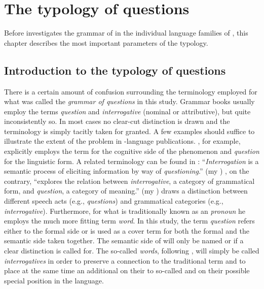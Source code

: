 \chapter{The typology of questions}

Before  investigates the grammar of  in the individual language families of , this chapter describes the most important parameters of the typology.


\section{Introduction to the typology of questions}\label{sec:4.1}

There is a certain amount of confusion surrounding the terminology employed for what was called the \textit{grammar of questions} in this study. Grammar books usually employ the terms \textit{question} and \textit{interrogative} (nominal or attributive), but quite inconsistently so. In most cases no clear-cut distinction is drawn and the terminology is simply tacitly taken for granted. A few examples should suffice to illustrate the extent of the problem in -language publications. \citet[250]{Schulze2007}, for example, explicitly employs the term \textit{} for the cognitive side of the phenomenon and \textit{question} for the linguistic form. A related terminology can be found in \citet[103]{Rajasingh2014}: “\textit{Interrogation} is a semantic process of eliciting information by way of \textit{questioning}.” (my ) \citet[411]{Huddleston1994}, on the contrary, “explores the relation between \textit{interrogative}, a category of grammatical form, and \textit{question}, a category of meaning.” (my ) \citet[376]{Dixon2012} draws a distinction between different speech acts (e.g., \textit{questions}) and grammatical categories (e.g., \textit{interrogative}). Furthermore, for what is traditionally known as an \textit{ pronoun} he employs the much more fitting term \textit{ word}. In this study, the term \textit{question} refers either to the formal side or is used as a cover term for both the formal and the semantic side taken together. The semantic side of  will only be named \textit{} or \textit{} if a clear distinction is called for. The so-called \textit{ words}, following \citet{Diessel2003}, will simply be called \textit{interrogatives} in order to preserve a connection to the traditional term and to place at the same time an additional  on their  to so-called \textit{} and on their possible special position in the language.

